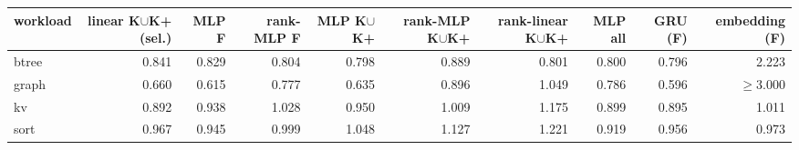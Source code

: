 \begin{tabular}{lrrrrrrrrr}
\toprule
workload & linear K$\cup$K{+} (sel.) & MLP F & rank-MLP F & MLP K$\cup$K{+} & rank-MLP K$\cup$K{+} & rank-linear K$\cup$K{+} & MLP all & GRU (F) & embedding (F) \\
\midrule
btree & 0.841 & 0.829 & 0.804 & 0.798 & 0.889 & 0.801 & 0.800 & 0.796 & 2.223 \\
graph & 0.660 & 0.615 & 0.777 & 0.635 & 0.896 & 1.049 & 0.786 & 0.596 & $\geq$3.000 \\
kv & 0.892 & 0.938 & 1.028 & 0.950 & 1.009 & 1.175 & 0.899 & 0.895 & 1.011 \\
sort & 0.967 & 0.945 & 0.999 & 1.048 & 1.127 & 1.221 & 0.919 & 0.956 & 0.973 \\
\bottomrule
\end{tabular}
